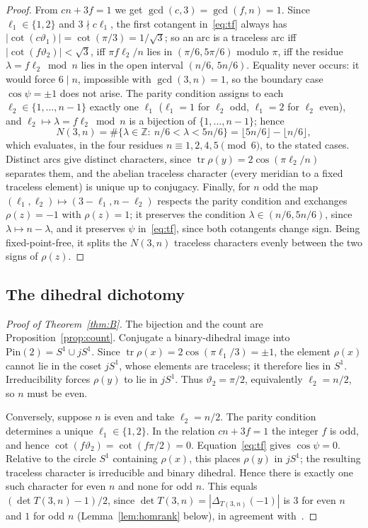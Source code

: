 \documentclass[11pt,reqno]{amsart}
\theoremstyle{plain}
\theoremstyle{definition}
\newcommand{\Z}{\mathbb{Z}}
\newcommand{\Pin}{\mathrm{Pin}(2)}
\newcommand{\tr}{\operatorname{tr}}
\begin{document}
\begin{proof}
From $cn+3f=1$ we get $\gcd(c,3)=\gcd(f,n)=1$. Since $\ell_1\in\{1,2\}$ and $3\nmid c\ell_1$, the first
cotangent in~\eqref{eq:tf} always has $|\cot(c\vartheta_1)|=\cot(\pi/3)=1/\sqrt3$; so an arc is a
traceless arc iff $|\cot(f\vartheta_2)|<\sqrt3$, iff $\pi f\ell_2/n$ lies in $(\pi/6,5\pi/6)$ modulo $\pi$,
iff the residue $\lambda=f\ell_2\bmod n$ lies in the open interval $(n/6,\,5n/6)$. Equality never occurs:
it would force $6\mid n$, impossible with $\gcd(3,n)=1$, so the boundary case $\cos\psi=\pm1$ does not
arise. The parity condition assigns to each $\ell_2\in\{1,\dots,n-1\}$ exactly one $\ell_1$ ($\ell_1=1$ for
$\ell_2$ odd, $\ell_1=2$ for $\ell_2$ even), and $\ell_2\mapsto\lambda=f\ell_2\bmod n$ is a bijection of
$\{1,\dots,n-1\}$; hence
\[
N(3,n)=\#\{\lambda\in\Z:\ n/6<\lambda<5n/6\}=\lfloor 5n/6\rfloor-\lfloor n/6\rfloor,
\]
which evaluates, in the four residues $n\equiv1,2,4,5\pmod6$, to the stated cases. Distinct arcs give
distinct characters, since $\tr\rho(y)=2\cos(\pi\ell_2/n)$ separates them, and the abelian traceless
character (every meridian to a fixed traceless element) is unique up to conjugacy. Finally, for $n$ odd
the map $(\ell_1,\ell_2)\mapsto(3-\ell_1,n-\ell_2)$ respects the parity condition and exchanges
$\rho(z)=-1$ with $\rho(z)=1$; it preserves the condition $\lambda\in(n/6,5n/6)$, since $\lambda\mapsto
n-\lambda$, and it preserves $\psi$ in~\eqref{eq:tf}, since both cotangents change sign. Being
fixed-point-free, it splits the $N(3,n)$ traceless characters evenly between the two signs of $\rho(z)$.
\end{proof}

\subsection{The dihedral dichotomy}
\begin{proof}[Proof of Theorem~\ref{thm:B}]
The bijection and the count are Proposition~\ref{prop:count}. Conjugate a binary-dihedral image into
$\Pin=S^1\cup jS^1$. Since $\tr\rho(x)=2\cos(\pi\ell_1/3)=\pm1$, the element $\rho(x)$ cannot lie in the
coset $jS^1$, whose elements are traceless; it therefore lies in $S^1$. Irreducibility forces $\rho(y)$ to
lie in $jS^1$. Thus $\vartheta_2=\pi/2$, equivalently $\ell_2=n/2$, so $n$ must be even.

Conversely, suppose $n$ is even and take $\ell_2=n/2$. The parity condition determines a unique
$\ell_1\in\{1,2\}$. In the relation $cn+3f=1$ the integer $f$ is odd, and hence
$\cot(f\vartheta_2)=\cot(f\pi/2)=0$. Equation~\eqref{eq:tf} gives $\cos\psi=0$. Relative to the circle
$S^1$ containing $\rho(x)$, this places $\rho(y)$ in $jS^1$; the resulting traceless character is
irreducible and binary dihedral. Hence there is exactly one such character for even $n$ and none for odd
$n$. This equals $(\det T(3,n)-1)/2$, since $\det T(3,n)=|\Delta_{T(3,n)}(-1)|$ is $3$ for even $n$ and $1$
for odd $n$ (Lemma~\ref{lem:homrank} below), in agreement with~\cite[Thm.~10]{Klassen}.
\end{proof}
\end{document}

